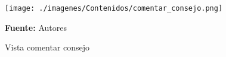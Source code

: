 \begin{figure}[!htb]
  \begin{center}
\texttt{[image: ./imagenes/Contenidos/comentar\_consejo.png]}
    \caption{Vista comentar consejo}
    \label{fig:Vista_comentar_consejo}
    \textbf{Fuente:}  Autores
  \end{center}
\end{figure}
